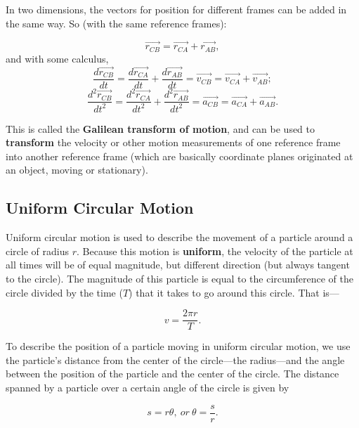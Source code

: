 \documentclass[12pt,letterpaper]{article}
\begin{document}
In two dimensions, the vectors for position for different frames can be added in the same way. So (with the same reference frames):

\begin{center}
	$$\vec{r_{CB}} = \vec{r_{CA}} + \vec{r_{AB}},$$
	and with some calculus,
	$$\frac{d\vec{r_{CB}}}{dt} = \frac{d\vec{r_{CA}}}{dt} + \frac{d\vec{r_{AB}}}{dt} = \vec{v_{CB}} = \vec{v_{CA}} + \vec{v_{AB}};$$
	$$\frac{d^{2}\vec{r_{CB}}}{dt^{2}} = \frac{d^{2}\vec{r_{CA}}}{dt^{2}} + \frac{d^{2}\vec{r_{AB}}}{dt^{2}} = \vec{a_{CB}} = \vec{a_{CA}} + \vec{a_{AB}}.$$\linebreak
\end{center}

This is called the \textbf{Galilean transform of motion}, and can be used to \textbf{transform} the velocity or other motion measurements of one reference frame into another reference frame (which are basically coordinate planes originated at an object, moving or stationary).

\subsection[Uniform Circular Motion]{Uniform Circular Motion}

Uniform circular motion is used to describe the movement of a particle around a circle of radius $r$. Because this motion is \textbf{uniform}, the velocity of the particle at all times will be of equal magnitude, but different direction (but always tangent to the circle). The magnitude of this particle is equal to the circumference of the circle divided by the time ($T$) that it takes to go around this circle. That is---

\begin{center}
	$$v = \frac{2\pi r}{T}.$$\linebreak
\end{center}

To describe the position of a particle moving in uniform circular motion, we use the particle's distance from the center of the circle---the radius---and the angle between the position of the particle and the center of the circle. The distance spanned by a particle over a certain angle of the circle is given by

\begin{center}
	$$s = r\theta,\ or\ \theta = \frac{s}{r}.$$\linebreak
\end{center}
\end{document}
